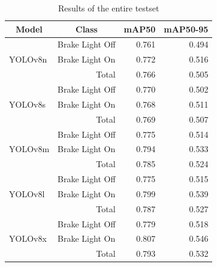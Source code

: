 \begin{table}[!h]
    \caption{Results of the entire testset}
    \label{tab:total}
    \begin{tabular}{llrr}
    \toprule
    \multicolumn{1}{c}{Model} & \multicolumn{1}{c}{Class} & \multicolumn{1}{c}{mAP50} & \multicolumn{1}{c}{mAP50-95} \\
    \midrule
    \multirow{3}{*}{YOLOv8n}  & Brake Light Off           & 0.761                     & 0.494                          \\
                              & Brake Light On            & 0.772                     & 0.516                        \\
                              & \multicolumn{1}{r}{Total} & 0.766                     & 0.505                        \\
    \midrule
    \multirow{3}{*}{YOLOv8s}  & Brake Light Off           & 0.770                     & 0.502                        \\
                              & Brake Light On            & 0.768                     & 0.511                        \\
                              & \multicolumn{1}{r}{Total} & 0.769                     & 0.507                        \\
    \midrule
    \multirow{3}{*}{YOLOv8m}  & Brake Light Off           & 0.775                     & 0.514                         \\
                              & Brake Light On            & 0.794                     & 0.533                        \\
                              & \multicolumn{1}{r}{Total} & 0.785                     & 0.524                        \\
    \midrule
    \multirow{3}{*}{YOLOv8l}  & Brake Light Off           & 0.775                     & 0.515                         \\
                              & Brake Light On            & 0.799                     & 0.539                        \\
                              & \multicolumn{1}{r}{Total} & 0.787                     & 0.527                      \\
    \midrule
    \multirow{3}{*}{YOLOv8x}  & Brake Light Off           & 0.779                     & 0.518                         \\
                              & Brake Light On            & 0.807                     & 0.546                        \\
                              & \multicolumn{1}{r}{Total} & 0.793                     & 0.532                      \\
    \bottomrule
    \end{tabular}%
\end{table}

